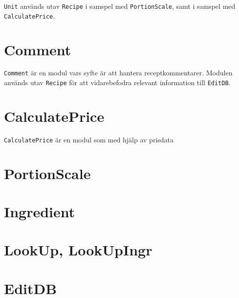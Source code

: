 \verb=Unit= används utav \verb=Recipe= i samspel med \verb=PortionScale=, samt i samspel med \verb=CalculatePrice=.

\section{Comment}\label{sec:ark.comment}
\verb=Comment= är en modul vars syfte är att hantera receptkommentarer. Modulen används utav \verb=Recipe= för att vidarebefodra relevant information till \verb=EditDB=.

\section{CalculatePrice}\label{sec:ark.calcprice}
\verb=CalculatePrice= är en modul som med hjälp av prisdata 

\section{PortionScale}\label{sec:ark.portscale}

\section{Ingredient}\label{sec:ark.ingredient}

\section{LookUp, LookUpIngr}\label{sec:ark.lookup}

\section{EditDB}\label{sec:ark.editdb}

